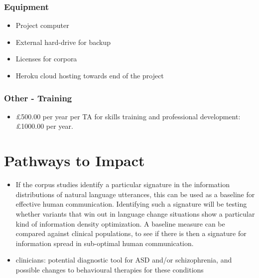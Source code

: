 \documentclass[11pt]{article}
\begin{document}
\subsubsection{Equipment}

\begin{itemize}
	\item Project computer 
	\item External hard-drive for backup
	\item Licenses for corpora
	\item Heroku cloud hosting towards end of the project
\end{itemize}

\subsubsection{Other - Training}

\begin{itemize}
	\item £500.00 per year per TA for skills training and professional development: £1000.00 per year.
\end{itemize}

\section{Pathways to Impact}

\begin{itemize}
	\item If the corpus studies identify a particular signature in the information distributions of natural language utterances, this can be used as a baseline for effective human communication. Identifying such a signature will be testing whether variants that win out in language change situations show a particular kind of information density optimization. A baseline measure can be compared against clinical populations, to see if there is then a signature for information spread in sub-optimal human communication. 
	\item clinicians: potential diagnostic tool for ASD and/or schizophrenia, and possible changes to behavioural therapies for these conditions
\end{itemize}








\end{document}
